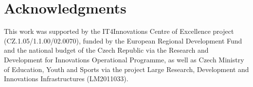 \documentclass[10pt,a4paper,twocolumn]{article}
\begin{document}
\section*{Acknowledgments}
This work was supported by the IT4Innovations Centre of Excellence project (CZ.1.05/1.1.00/02.0070), funded by the European Regional Development Fund and the national budget of the Czech Republic via the Research and Development for Innovations Operational Programme, as well as Czech Ministry of Education, Youth and Sports via the project Large Research, Development and Innovations Infrastructures (LM2011033).



\end{document}
